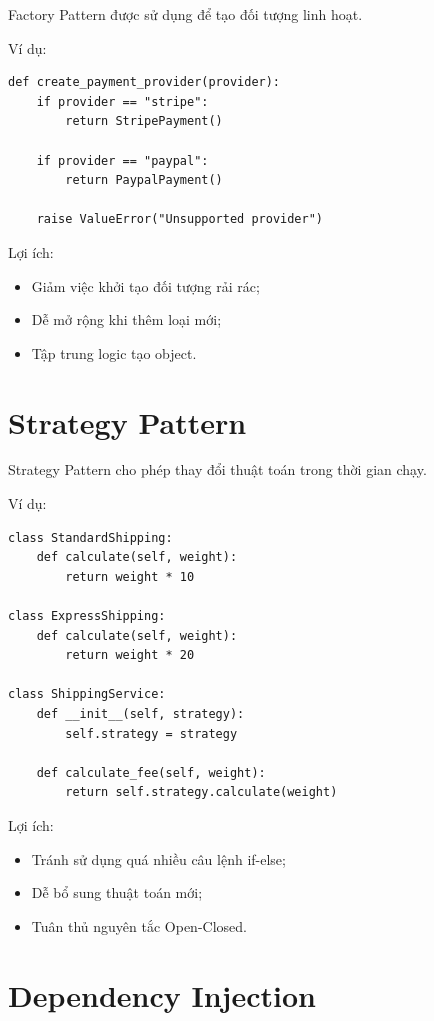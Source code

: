 \documentclass[12pt,a4paper]{article}
\begin{document}
Factory Pattern được sử dụng để tạo đối tượng linh hoạt.

Ví dụ:

\begin{lstlisting}
def create_payment_provider(provider):
    if provider == "stripe":
        return StripePayment()

    if provider == "paypal":
        return PaypalPayment()

    raise ValueError("Unsupported provider")
\end{lstlisting}

Lợi ích:

\begin{itemize}
    \item Giảm việc khởi tạo đối tượng rải rác;
    \item Dễ mở rộng khi thêm loại mới;
    \item Tập trung logic tạo object.
\end{itemize}

\section{Strategy Pattern}

Strategy Pattern cho phép thay đổi thuật toán trong thời gian chạy.

Ví dụ:

\begin{lstlisting}
class StandardShipping:
    def calculate(self, weight):
        return weight * 10

class ExpressShipping:
    def calculate(self, weight):
        return weight * 20

class ShippingService:
    def __init__(self, strategy):
        self.strategy = strategy

    def calculate_fee(self, weight):
        return self.strategy.calculate(weight)
\end{lstlisting}

Lợi ích:

\begin{itemize}
    \item Tránh sử dụng quá nhiều câu lệnh if-else;
    \item Dễ bổ sung thuật toán mới;
    \item Tuân thủ nguyên tắc Open-Closed.
\end{itemize}

\section{Dependency Injection}
\end{document}
